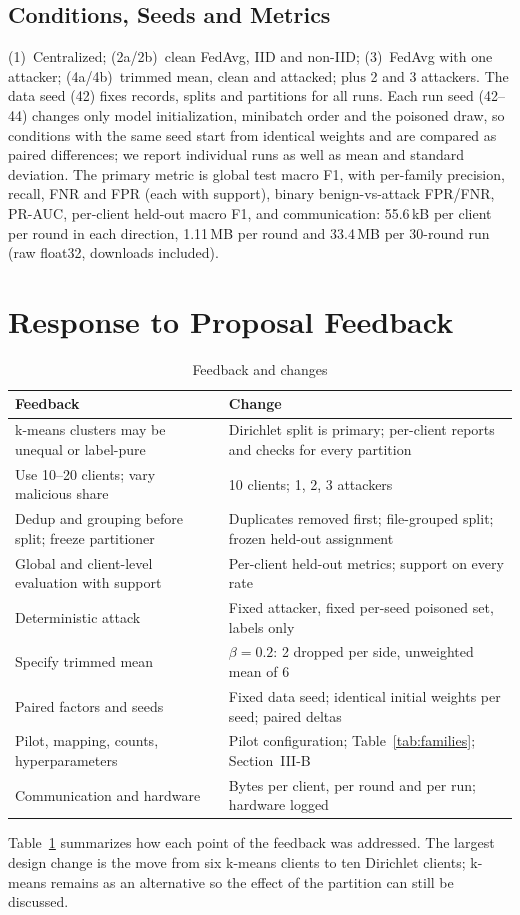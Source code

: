 \documentclass[journal]{IEEEtran}
\begin{document}
\subsection{Conditions, Seeds and Metrics}
(1)~Centralized; (2a/2b)~clean FedAvg, IID and non-IID; (3)~FedAvg with one
attacker; (4a/4b)~trimmed mean, clean and attacked; plus 2 and 3 attackers.
The data seed (42) fixes records, splits and partitions for all runs. Each run
seed (42--44) changes only model initialization, minibatch order and the
poisoned draw, so conditions with the same seed start from identical weights
and are compared as paired differences; we report individual runs as well as
mean and standard deviation. The primary metric is global test macro F1, with
per-family precision, recall, FNR and FPR (each with support), binary
benign-vs-attack FPR/FNR, PR-AUC, per-client held-out macro F1, and
communication: 55.6\,kB per client per round in each direction, 1.11\,MB per
round and 33.4\,MB per 30-round run (raw float32, downloads included).

\section{Response to Proposal Feedback}
\begin{table}[t]
\caption{Feedback and changes}
\label{tab:feedback}
\centering\footnotesize
\setlength{\tabcolsep}{3pt}
\begin{tabular}{@{}p{2.6cm}p{5.5cm}@{}}
\toprule
Feedback & Change \\
\midrule
k-means clusters may be unequal or label-pure & Dirichlet split is primary; per-client reports and checks for every partition \\
Use 10--20 clients; vary malicious share & 10 clients; 1, 2, 3 attackers \\
Dedup and grouping before split; freeze partitioner & Duplicates removed first; file-grouped split; frozen held-out assignment \\
Global and client-level evaluation with support & Per-client held-out metrics; support on every rate \\
Deterministic attack & Fixed attacker, fixed per-seed poisoned set, labels only \\
Specify trimmed mean & $\beta{=}0.2$: 2 dropped per side, unweighted mean of 6 \\
Paired factors and seeds & Fixed data seed; identical initial weights per seed; paired deltas \\
Pilot, mapping, counts, hyperparameters & Pilot configuration; Table~\ref{tab:families}; Section~III-B \\
Communication and hardware & Bytes per client, per round and per run; hardware logged \\
\bottomrule
\end{tabular}
\end{table}
Table~\ref{tab:feedback} summarizes how each point of the feedback was
addressed. The largest design change is the move from six k-means clients to
ten Dirichlet clients; k-means remains as an alternative so the effect of the
partition can still be discussed.
\end{document}
